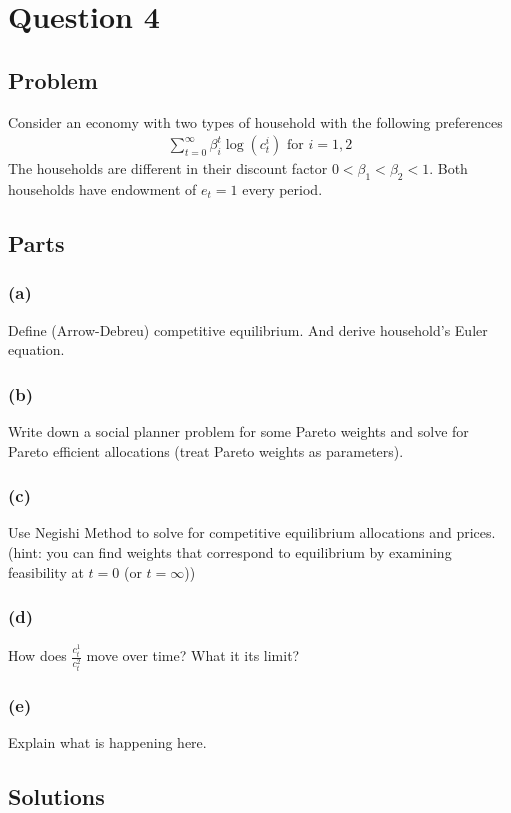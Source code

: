 \documentclass[10pt, a4paper]{article}
\begin{document}
\section*{Question 4}
  \subsection*{Problem}
    Consider an economy with two types of household with the following preferences
    \begin{gather*}
      \sum_{t=0}^{\infty} \beta_i^t \log(c^i_t) \text{ for } i = 1,2
    \end{gather*}
    The households are different in their discount factor $0 < \beta_1 < \beta_2 < 1$. Both households have endowment of $e_t = 1$ every period.
  \subsection*{Parts}
    \subsubsection*{(a)}
      Define (Arrow-Debreu) competitive equilibrium. And derive household's Euler equation.
    \subsubsection*{(b)}
      Write down a social planner problem for some Pareto weights and solve for Pareto efficient allocations (treat Pareto weights as parameters).
    \subsubsection*{(c)}
      Use Negishi Method to solve for competitive equilibrium allocations and prices. (hint: you can find weights that correspond to equilibrium by examining feasibility at $t = 0$ (or $t = \infty$))
    \subsubsection*{(d)}
      How does $\frac{c^1_t}{c^2_t}$ move over time? What it its limit?
    \subsubsection*{(e)}
      Explain what is happening here.
  \subsection*{Solutions}
\end{document}
